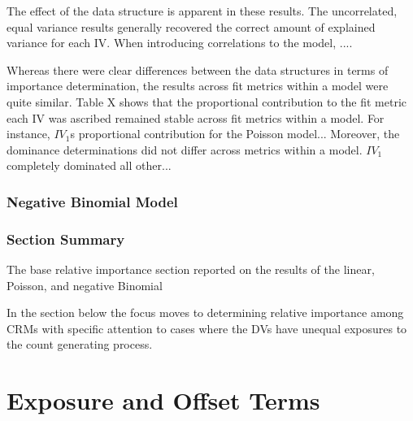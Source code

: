 \documentclass[ShortAfour,times,sageapa]{sagej}
\begin{document}
	The effect of the data structure is apparent in these results.  
	The uncorrelated, equal variance results generally recovered the correct amount of explained variance for each IV.  
	When introducing correlations to the model, ....
	
	Whereas there were clear differences between the data structures in terms of importance determination, the results across fit metrics within a model were quite similar.
	Table X shows that the proportional contribution to the fit metric each IV was ascribed remained stable across fit metrics within a model.
	For instance, $IV_1$s proportional contribution for the Poisson model...
	Moreover, the dominance determinations did not differ across metrics within a model.
	$IV_1$ completely dominated all other...
	
	\subsubsection{Negative Binomial Model}
	
	\subsubsection{Section Summary}
	
	The base relative importance section reported on the results of the linear, Poisson, and negative Binomial
	
	
	In the section below the focus moves to determining relative importance among CRMs with specific attention to cases where the DVs have unequal exposures to the count generating process.
	
	
	
\section{Exposure and Offset Terms}
	
\end{document}
